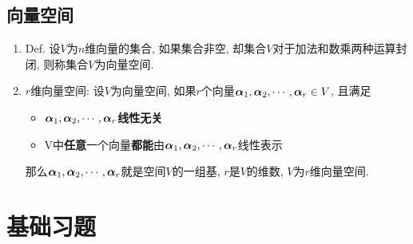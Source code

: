 \subsection{向量空间}
\begin{enumerate}
\item Def. 设$V$为$n$维向量的集合, 如果集合非空, 却集合$V$对于加法和数乘两种运算封闭, 则称集合$V$为向量空间. 
\item $r$维向量空间: 设$V$为向量空间, 如果$r$个向量$\boldsymbol{\alpha}_{1},\boldsymbol{\alpha}_{2},\cdots,\boldsymbol{\alpha}_{r}\in V$,
且满足
\begin{itemize}
\item $\boldsymbol{\alpha}_{1},\boldsymbol{\alpha}_{2},\cdots,\boldsymbol{\alpha}_{r}$\textbf{线性无关}
\item V中\textbf{任意}一个向量\textbf{都能}由$\boldsymbol{\alpha}_{1},\boldsymbol{\alpha}_{2},\cdots,\boldsymbol{\alpha}_{r}$线性表示
\end{itemize}
那么$\boldsymbol{\alpha}_{1},\boldsymbol{\alpha}_{2},\cdots,\boldsymbol{\alpha}_{r}$就是空间$V$的一组基, $r$是$V$的维数, $V$为$r$维向量空间. 
\end{enumerate}

\section{基础习题}
